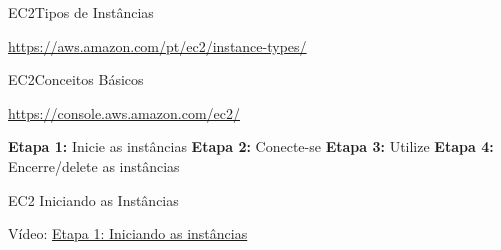 \documentclass[xcolor=table]{beamer}
\begin{document}
\begin{frame}[c]{EC2}{Tipos de Instâncias}


        \begin{outline}
            \1[]\url{https://aws.amazon.com/pt/ec2/instance-types/}
        \end{outline}
        
      
            \begin{outline}          
            \begin{figure}
                \hfill
            \end{figure}
            
            
            \end{outline}
       
\end{frame}


\begin{frame}[c]{EC2}{Conceitos Básicos}

        \begin{outline}
            \1[]\url{https://console.aws.amazon.com/ec2/}
        \end{outline}
        
        
        \begin{center}
            \begin{outline}                
               \1[] \textbf{Etapa 1:} Inicie as instâncias
               \1[] \textbf{Etapa 2:} Conecte-se 
               \1[] \textbf{Etapa 3:} Utilize
               \1[] \textbf{Etapa 4:} Encerre/\alert{delete} as instâncias
            \end{outline}
        \end{center}

\end{frame}


\begin{frame}[c]{EC2} {Iniciando as Instâncias}

        \begin{center}
            Vídeo: \href{run:./1_running.ogv}{Etapa 1: Iniciando as instâncias}
        \end{center}  

\end{frame}
\end{document}
